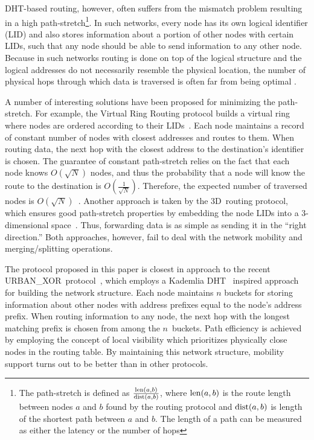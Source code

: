 \documentclass[conference]{IEEEtran}
\theoremstyle{definition}
\newcommand{\urbanxor}{URBAN\_XOR}
\begin{document}
DHT-based routing, however, often suffers from the mismatch problem resulting in a high path-stretch\footnote{The path-stretch is defined as $ \frac{{\rm len}(a,b)}{{\rm dist}(a,b)} $, where ${\rm len}(a,b)$ is the route length between nodes $a$ and $b$ found by the routing protocol and ${\rm dist}(a,b)$ is length of the shortest path between $a$ and $b$. The length of a path can be measured as either the latency or the number of hops}. In such networks, every node has its own logical identifier (LID) and also stores information about a portion of other nodes with certain LIDs, such that any node should be able to send information to any other node. Because in such networks routing is done on top of the logical structure and the logical addresses do not necessarily resemble the physical location, the number of physical hops through which data is traversed is often far from being optimal \cite{Abid}.

A number of interesting solutions have been proposed for minimizing the path-stretch. For example, the Virtual Ring Routing protocol builds a virtual ring where nodes are ordered according to their LIDs~\cite{VRR}. Each node maintains a record of constant number of nodes with closest addresses and routes to them. When routing data, the next hop with the closest address to the destination's identifier is chosen. The guarantee of constant path-stretch relies on the fact that each node knows $O(\sqrt{N})$ nodes, and thus the probability that a node will know the route to the destination is $O(\frac{1}{\sqrt{N}})$. Therefore, the expected number of traversed nodes is $O(\sqrt{N})$~\cite{VRR}. Another approach is taken by the 3D~routing protocol, which ensures good path-stretch properties by embedding the node LIDs into a 3-dimensional space~\cite{3drp}. Thus, forwarding data is as simple as sending it in the ``right direction.'' Both approaches, however, fail to deal with the network mobility and merging/splitting operations. 

The protocol proposed in this paper is closest in approach to the recent
\urbanxor\ protocol~\cite{Pasquini}, which employs a Kademlia DHT~\cite{kademlia} inspired approach for building the network structure. Each node maintains $n$ buckets for storing information about other nodes with address prefixes equal to the node's address prefix. When routing information to any node, the next hop with the longest matching prefix is chosen from among the $n$~buckets. Path efficiency is achieved by employing the concept of local visibility which prioritizes physically close nodes in the routing table. By maintaining this network structure, mobility support turns out to be better than in other protocols.
\end{document}
